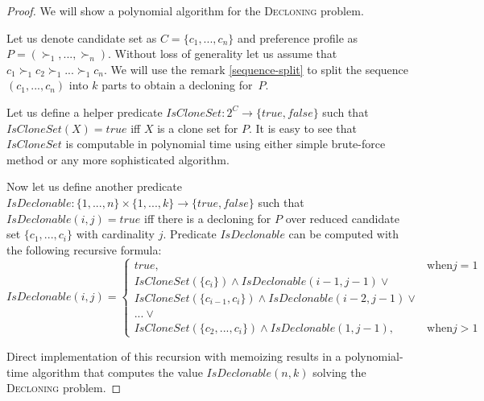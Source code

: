 \begin{proof}
We will show a polynomial algorithm for the \textsc{Decloning} problem.

Let us denote candidate set as $C = \{c_1, ..., c_n\}$ and preference profile as $P = (\succ_1, ... , \succ_n)$.
Without loss of generality let us assume that $c_1 \succ_1 c_2 \succ_1 ... \succ_1 c_n$.
We will use the remark \ref{sequence-split} to split the sequence $(c_1, ..., c_n)$
into $k$ parts to obtain a decloning for~$P$.

Let us define a helper predicate $IsCloneSet: 2^C \rightarrow \{true,false\}$
such that $IsCloneSet(X) = true$ iff $X$ is a clone set for $P$.
It is easy to see that $IsCloneSet$ is computable in polynomial time
using either simple brute-force method or any more sophisticated algorithm.

Now let us define another predicate $IsDeclonable: \{1,...,n\}\times\{1,...,k\} \rightarrow \{true,false\}$
such that $IsDeclonable(i,j)= true$ iff there is a decloning for $P$ over reduced candidate set $\{c_1,...,c_i\}$
with cardinality $j$.
Predicate $IsDeclonable$ can be computed with the following recursive formula:
$$ IsDeclonable(i,j) =
\begin{cases}
true,	&\text{when} j=1 \\
IsCloneSet(\{c_i\}) \wedge IsDeclonable(i-1,j-1) \vee \\
IsCloneSet(\{c_{i-1},c_i\}) \wedge IsDeclonable(i-2, j-1) \vee \\
... \vee \\
IsCloneSet(\{c_2,...,c_i\}) \wedge IsDeclonable(1,j-1)
, 		&\text{when} j>1
\end{cases}
$$

Direct implementation of this recursion with memoizing
results in a polynomial-time algorithm that computes the value $IsDeclonable(n,k)$
solving the \textsc{Decloning} problem.
\end{proof}
